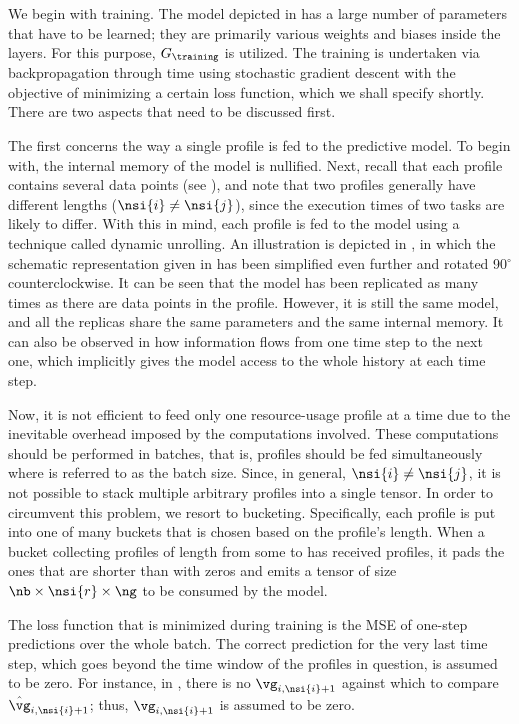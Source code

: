 We begin with training. The model depicted in  has
a large number of parameters that have to be learned; they are primarily various
weights and biases inside the layers. For this purpose, $G_\training$ is
utilized. The training is undertaken via backpropagation through time using
stochastic gradient descent \cite{goodfellow2016} with the objective of
minimizing a certain loss function, which we shall specify shortly. There are
two aspects that need to be discussed first.

The first concerns the way a single profile is fed to the predictive model. To
begin with, the internal memory of the model is nullified. Next, recall that
each profile contains several data points (see ), and note
that two profiles generally have different lengths ($\nsi{i} \neq \nsi{j}$),
since the execution times of two tasks are likely to differ. With this in mind,
each profile is fed to the model using a technique called dynamic unrolling. An
illustration is depicted in , in which the schematic
representation given in  has been simplified even
further and rotated 90${}^\circ$ counterclockwise. It can be seen that the model
has been replicated as many times as there are data points in the profile.
However, it is still the same model, and all the replicas share the same
parameters and the same internal memory. It can also be observed in
 how information flows from one time step to the next
one, which implicitly gives the model access to the whole history at each time
step.

Now, it is not efficient to feed only one resource-usage profile at a time due
to the inevitable overhead imposed by the computations involved. These
computations should be performed in batches, that is, \nb profiles should be fed
simultaneously where \nb is referred to as the batch size. Since, in general,
$\nsi{i} \neq \nsi{j}$, it is not possible to stack multiple arbitrary profiles
into a single tensor. In order to circumvent this problem, we resort to
bucketing. Specifically, each profile is put into one of many buckets that is
chosen based on the profile's length. When a bucket collecting profiles of
length from some  to  has received \nb profiles, it pads the ones
that are shorter than  with zeros and emits a tensor of size $\nb \times
\nsi{r} \times \ng$ to be consumed by the model.

The loss function that is minimized during training is the \ac{MSE} of one-step
predictions over the whole batch. The correct prediction for the very last time
step, which goes beyond the time window of the profiles in question, is assumed
to be zero. For instance, in , there is no $\vg_{i,
\nsi{i} + 1}$ against which to compare $\hat{\vg}_{i, \nsi{i} + 1}$; thus,
$\vg_{i, \nsi{i} + 1}$ is assumed to be zero.

